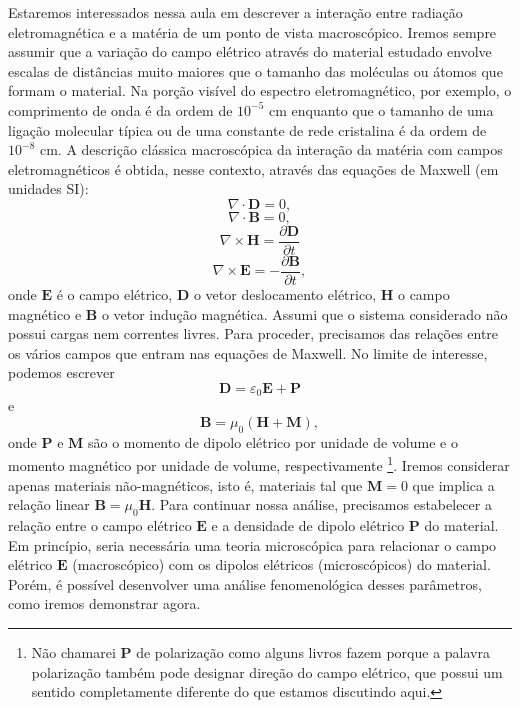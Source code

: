 \documentclass{article}
\begin{document}
Estaremos interessados nessa aula em descrever a interação entre radiação eletromagnética e a matéria de um ponto de vista macroscópico. Iremos sempre assumir que a variação do campo elétrico através do material estudado envolve escalas de distâncias muito maiores que o tamanho das moléculas ou átomos que formam o material. Na porção visível do espectro eletromagnético, por exemplo, o comprimento de onda é da ordem de $10^{-5}$ cm enquanto que o tamanho de uma ligação molecular típica ou de uma constante de rede cristalina é da ordem de $10^{-8}$ cm. A descrição clássica macroscópica da interação da matéria com campos eletromagnéticos é obtida, nesse contexto, através das equações de Maxwell (em unidades SI):
\begin{equation}
    \nabla\cdot\mathbf{D} = 0,
\end{equation}
\begin{equation}
    \nabla\cdot\mathbf{B} = 0,
\end{equation}
\begin{equation}
    \nabla\times\mathbf{H} = \frac{\partial \mathbf{D}}{\partial t}
\end{equation}
\begin{equation}
    \nabla\times\mathbf{E} = -\frac{\partial \mathbf{B}}{\partial t},
\end{equation}
onde $\mathbf{E}$ é o campo elétrico, $\mathbf{D}$ o vetor deslocamento elétrico, $\mathbf{H}$ o campo magnético e $\mathbf{B}$ o vetor indução magnética. Assumi que o sistema considerado não possui cargas nem correntes livres. Para proceder, precisamos das relações entre os vários campos que entram nas equações de Maxwell. No limite de interesse, podemos escrever
\begin{equation}
    \mathbf{D} = \varepsilon_0 \mathbf{E} + \mathbf{P}
\end{equation}
e
\begin{equation}
    \mathbf{B} = \mu_0( \mathbf{H} + \mathbf{M} ),
\end{equation}
onde $\mathbf{P}$ e $\mathbf{M}$ são o momento de dipolo elétrico por unidade de volume e o momento magnético por unidade de volume, respectivamente \footnote{Não chamarei $\mathbf{P}$ de polarização como alguns livros fazem porque a palavra polarização também pode designar direção do campo elétrico, que possui um sentido completamente diferente do que estamos discutindo aqui.}. Iremos considerar apenas materiais não-magnéticos, isto é, materiais tal que $\mathbf{M} = 0$ que implica a relação linear $\mathbf{B} = \mu_0 \mathbf{H}$. Para continuar nossa análise, precisamos estabelecer a relação entre o campo elétrico $\mathbf{E}$ e a densidade de dipolo elétrico $\mathbf{P}$ do material. Em princípio, seria necessária uma teoria microscópica para relacionar o campo elétrico $\mathbf{E}$ (macroscópico) com os dipolos elétricos (microscópicos) do material. Porém, é possível desenvolver uma análise fenomenológica desses parâmetros, como iremos demonstrar agora.
\end{document}
